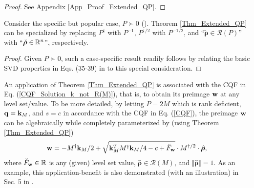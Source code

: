 \documentclass{imaman}
\newcommand{\beq}{\begin{eqnarray}}
\newcommand{\eeq}{\end{eqnarray}}
\newcommand{\bfq}{{\bf q}}
\newcommand{\bfw}{{\bf w}}
\newcommand{\bfk}{{\bf k}}
\newcommand{\bfrho}{{\boldsymbol \rho}}
\newcommand{\real}{\mathbb{R}}
\newcommand{\calR}{{\mathcal R}}
\newcommand{\itn}{{\it n}}
\numberwithin{equation}{section}
\begin{document}
\begin{proof}
See Appendix \ref{App_Proof_Extended_QP}.
\end{proof}

\begin{corollary}
Consider the specific but popular case, $P\succ 0$ ({\rm\cite{Lu(Ye):03(16)}}). Theorem {\rm\ref{Thm_Extended_QP}} can be specialized by replacing $P^\dagger$ with $P^{-1}$, $P^{\dagger/2}$ with $P^{-1/2}$, and ``$\check\bfrho\in\calR(P)$'' with ``$\check\bfrho\in\real^\itn$'', respectively.
\end{corollary}

\begin{proof}
Given $P\succ 0$, such a case-specific result readily follows by relating the basic SVD properties in Eqs. (35-39) in \cite{LiLiHs:20} to this special consideration.
\end{proof}

\begin{remark}
An application of Theorem \ref{Thm_Extended_QP} is associated with the CQF
in Eq. (\ref{CQF_Solution_k_not_R(M)}), that is, to obtain its preimage $\bfw$ at any level set/value. To be more detailed, by letting $P=2M$ which is rank deficient, $\bfq=\bfk_M$, and $s=c$ in accordance with the CQF in Eq. (\ref{CQF}), the preimage $\bfw$ can be algebraically while completely parameterized by (using Theorem \ref{Thm_Extended_QP})
\beq
\bfw=-M^\dagger\bfk_M/2+\sqrt{\bfk_M^TM^\dagger\bfk_M/4-c+\breve F_\bfw}\cdot M^{\dagger/2}\cdot \hat\bfrho,
\label{Preimage_CQF_Solution_k_not_R(M)}
\eeq
where $\breve F_\bfw\in\real$ is any (given) level set value, $\hat\bfrho\in \calR(M)$, and $\Vert\hat\bfrho\Vert=1$. As an example, this application-benefit is also demonstrated (with an illustration) in Sec. 5 in \cite{LiLiHs:20}.
\label{Rem_Thm_Extended_QP_w}
\end{remark}
\end{document}
